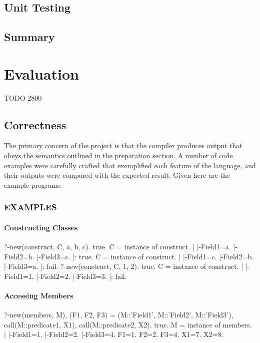 \documentclass[12pt,a4paper,twoside,openright]{report}
\begin{document}
\section{Unit Testing}

\section{Summary}

\chapter{Evaluation}

TODO 2800

\section{Correctness}

The primary concern of the project is that the compiler produces output that obeys the semantics outlined in the preparation section. A number of code examples were carefully crafted that exemplified each feature of the language, and their outputs were compared with the expected result. Given here are the example programs:

\subsection{EXAMPLES}

	\subsubsection{Constructing Classes}
	
?-new(construct, C, a, b, c).
true.
C = instance of construct.
        |
        |-Field1=a.
        |-Field2=b.
        |-Field3=c.
|: 
true.
C = instance of construct.
        |
        |-Field1=c.
        |-Field2=b.
        |-Field3=a.
|: 
fail.
?-new(construct, C, 1, 2).
true.
C = instance of construct.
        |
        |-Field1=1.
        |-Field2=2.
        |-Field3=3.
|: 
fail.

	\subsubsection{Accessing Members}
	
?-new(members, M), (F1, F2, F3) = (M::'Field1', M::'Field2', M::'Field3'), call(M::predicate1, X1), call(M::predicate2, X2).
true.
M = instance of members.
        |
        |-Field1=1.
        |-Field2=2.
        |-Field3=4.
F1=1.
F2=2.
F3=4.
X1=7.
X2=8.
\end{document}
